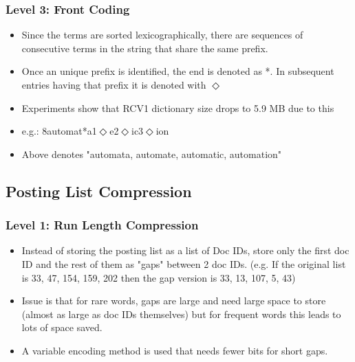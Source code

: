 \documentclass{article}
\begin{document}
\subsubsection{Level 3: Front Coding}
\begin{itemize}
    \item Since the terms are sorted lexicographically, there are sequences of consecutive terms in the string that share the same prefix. 
    
    \item Once an unique prefix is identified, the end is denoted as *. In subsequent entries having that prefix it is denoted with $\Diamond$
    
    \item Experiments show that RCV1 dictionary size drops to 5.9 MB due to this
    
    \item e.g.: 8automat*a1$\Diamond$e2$\Diamond$ic3$\Diamond$ion
    
    \item Above denotes "automata, automate, automatic, automation"
\end{itemize}

\subsection{Posting List Compression}
\subsubsection{Level 1: Run Length Compression}
\begin{itemize}
    \item Instead of storing the posting list as a list of Doc IDs, store only the first doc ID and the rest of them as "gaps" between 2 doc IDs. (e.g. If the original list is 33, 47, 154, 159, 202 then the gap version is 33, 13, 107, 5, 43)
    
    \item Issue is that for rare words, gaps are large and need large space to store (almost as large as doc IDs themselves) but for frequent words this leads to lots of space saved. 
    
    \item A variable encoding method is used that needs fewer bits for short gaps.
\end{itemize}
\end{document}
